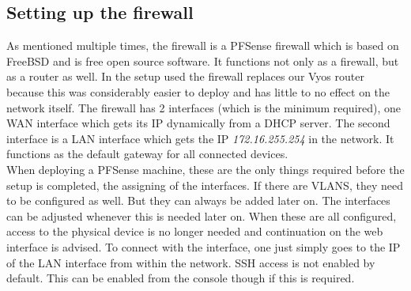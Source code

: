 \subsection{Setting up the firewall}
As mentioned multiple times, the firewall is a PFSense firewall which is based on FreeBSD and is free open source software. It functions not only as a firewall, but as a router as well. In the setup used the firewall replaces our Vyos router because this was considerably easier to deploy and has little to no effect on the network itself. The firewall has 2 interfaces (which is the minimum required), one WAN interface which gets its IP dynamically from a DHCP server. The second interface is a LAN interface which gets the IP \textit{172.16.255.254} in the network. It functions as the default gateway for all connected devices.\\

 When deploying a PFSense machine, these are the only things required before the setup is completed, the assigning of the interfaces. If there are VLANS, they need to be configured as well. But they can always be added later on. The interfaces can be adjusted whenever this is needed later on. When these are all configured, access to the physical device is no longer needed and continuation on the web interface is advised. To connect with the interface, one just simply goes to the IP of the LAN interface from within the network. SSH access is not enabled by default. This can be enabled from the console though if this is required.\\
 
